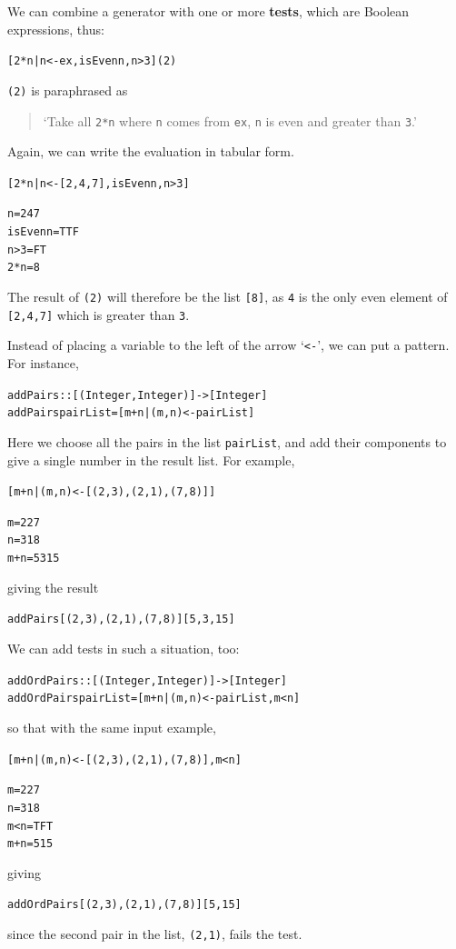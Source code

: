 \begin{example}
We can combine a generator with one or more {\bf tests}, 
 which are Boolean
expressions, thus:
\begin{alltt}
[ 2*n | n <- ex , isEven n , n>3 ]\hfill (2)
\end{alltt}
\texttt{(2)} is paraphrased as
\begin{quote}
`Take all \texttt{2*n} where \texttt{n} comes from \texttt{ex}, \texttt{n} is even and
greater than \texttt{3}.'
\end{quote}
Again, we can write the evaluation in tabular form.
\begin{alltt}
[ 2*n | n <- [2,4,7] , isEven n , n>3 ]
 
       n   =   2   4   7
isEven n   =   T   T   F
     n>3   =   F   T   
     2*n   =       8   
\end{alltt}
The result of \texttt{(2)} will therefore be the list \texttt{[8]}, as \texttt{4} is
the only even element of \texttt{[2,4,7]} which is greater than \texttt{3}.

Instead of placing a variable to the left of the arrow `\texttt{<-}', we can put
a pattern. For instance,
\begin{alltt}
addPairs :: [(Integer,Integer)] -> [Integer]
addPairs pairList = [ m+n | (m,n) <- pairList ]
\end{alltt}
Here we choose all the pairs in the list \texttt{pairList}, and add their
components to give a single number in the result list. For example,
\begin{alltt}
[ m+n | (m,n) <- [(2,3),(2,1),(7,8)] ]
 
  m   =   2   2   7  
  n   =   3   1   8
m+n   =   5   3  15
\end{alltt}
giving the result 
\begin{alltt}
addPairs [(2,3),(2,1),(7,8)] \step{}[5,3,15]
\end{alltt}

We can add tests in such a situation, too:
\begin{alltt}
addOrdPairs :: [(Integer,Integer)] -> [Integer]
addOrdPairs pairList = [ m+n | (m,n) <- pairList , m<n ]
\end{alltt}
so that with the same input example, 
\begin{alltt}
[ m+n | (m,n) <- [(2,3),(2,1),(7,8)] , m<n ]
 
  m   =   2   2   7  
  n   =   3   1   8
m<n   =   T   F   T
m+n   =   5      15
\end{alltt}
giving 
\begin{alltt}
addOrdPairs [(2,3),(2,1),(7,8)] \step{}[5,15]
\end{alltt}
since the second pair in the list, \texttt{(2,1)}, fails the test.


\end{example}
